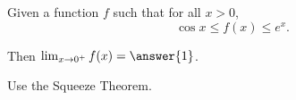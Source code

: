\documentclass{ximera}
\author{Nela Lakos \and Kyle Parsons}
\begin{document}
\begin{exercise}

Given a function $f$ such that for all $x>0$, 
\[
\cos x \leq f(x) \leq e^x.
\]

Then $\lim_{x\to0^+}f(x) = \answer{1}$.

\begin{hint}
Use the Squeeze Theorem.
\end{hint}

\end{exercise}
\end{document}
